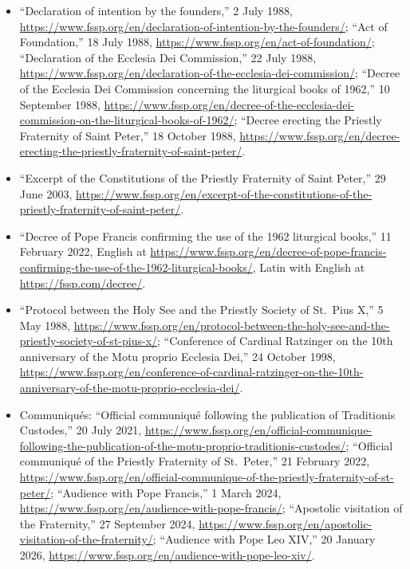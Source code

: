 \begin{itemize}
\item ``Declaration of intention by the founders,'' 2 July 1988,
\url{https://www.fssp.org/en/declaration-of-intention-by-the-founders/};
``Act of Foundation,'' 18 July 1988,
\url{https://www.fssp.org/en/act-of-foundation/}; ``Declaration of the
Ecclesia Dei Commission,'' 22 July 1988,
\url{https://www.fssp.org/en/declaration-of-the-ecclesia-dei-commission/};
``Decree of the Ecclesia Dei Commission concerning the liturgical books of
1962,'' 10 September 1988,
\url{https://www.fssp.org/en/decree-of-the-ecclesia-dei-commission-on-the-liturgical-books-of-1962/};
``Decree erecting the Priestly Fraternity of Saint Peter,'' 18 October
1988,
\url{https://www.fssp.org/en/decree-erecting-the-priestly-fraternity-of-saint-peter/}.
\item ``Excerpt of the Constitutions of the Priestly Fraternity of Saint
Peter,'' 29 June 2003,
\url{https://www.fssp.org/en/excerpt-of-the-constitutions-of-the-priestly-fraternity-of-saint-peter/}.
\item ``Decree of Pope Francis confirming the use of the 1962 liturgical
books,'' 11 February 2022, English at
\url{https://www.fssp.org/en/decree-of-pope-francis-confirming-the-use-of-the-1962-liturgical-books/},
Latin with English at \url{https://fssp.com/decree/}.
\item ``Protocol between the Holy See and the Priestly Society of
St.\ Pius X,'' 5 May 1988,
\url{https://www.fssp.org/en/protocol-between-the-holy-see-and-the-priestly-society-of-st-pius-x/};
``Conference of Cardinal Ratzinger on the 10th anniversary of the Motu
proprio Ecclesia Dei,'' 24 October 1998,
\url{https://www.fssp.org/en/conference-of-cardinal-ratzinger-on-the-10th-anniversary-of-the-motu-proprio-ecclesia-dei/}.
\item Communiqués: ``Official communiqué following the publication of
Traditionis Custodes,'' 20 July 2021,
\url{https://www.fssp.org/en/official-communique-following-the-publication-of-the-motu-proprio-traditionis-custodes/};
``Official communiqué of the Priestly Fraternity of St.\ Peter,'' 21
February 2022,
\url{https://www.fssp.org/en/official-communique-of-the-priestly-fraternity-of-st-peter/};
``Audience with Pope Francis,'' 1 March 2024,
\url{https://www.fssp.org/en/audience-with-pope-francis/}; ``Apostolic
visitation of the Fraternity,'' 27 September 2024,
\url{https://www.fssp.org/en/apostolic-visitation-of-the-fraternity/};
``Audience with Pope Leo XIV,'' 20 January 2026,
\url{https://www.fssp.org/en/audience-with-pope-leo-xiv/}.

\end{itemize}
